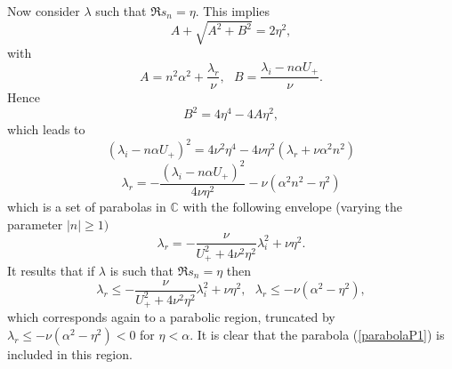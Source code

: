 \documentclass[11pt]{article}
\begin{document}
Now consider $\lambda $ such that $\Re s_{n}=\eta .$ This implies%
\begin{equation*}
A+\sqrt{A^{2}+B^{2}}=2\eta ^{2},
\end{equation*}%
with%
\begin{equation*}
A=n^{2}\alpha ^{2}+\frac{\lambda _{r}}{\nu },\text{ }B=\frac{\lambda
_{i}-n\alpha U_+ }{\nu }.
\end{equation*}%
Hence%
\begin{equation*}
B^{2}=4\eta ^{4}-4A\eta ^{2},
\end{equation*}%
which leads to%
\begin{equation*}
(\lambda _{i}-n\alpha U_+ )^{2}=4\nu ^{2}\eta ^{4}-4\nu \eta ^{2}(\lambda _{r}+\nu
\alpha ^{2}n^{2})
\end{equation*}%
\begin{equation*}
\lambda _{r}=-\frac{(\lambda _{i}-n\alpha U_+ )^{2}}{4\nu \eta ^{2}}-\nu (\alpha
^{2}n^{2}-\eta ^{2})
\end{equation*}%
which is a set of parabolas in $\mathbb{C} $ with the following envelope
(varying the parameter $|n|\geq 1)$%
\begin{equation*}
\lambda _{r}=-\frac{\nu }{U_+^{2}+4\nu ^{2}\eta ^{2}}%
\lambda _{i}^{2}+\nu \eta ^{2}.
\end{equation*}%
It results that if $\lambda $ is such that $\Re s_{n}=\eta $ then 
\begin{equation}
\lambda _{r}\leq -\frac{\nu }{U_+^{2}+4\nu ^{2}
\eta ^{2}}\lambda _{i}^{2}+\nu \eta ^{2},\text{ }\lambda _{r}\leq -\nu (\alpha
^{2}-\eta ^{2}),  \label{parabolaP2}
\end{equation}%
which corresponds again to a parabolic region, truncated by $\lambda
_{r}\leq -\nu (\alpha ^{2}-\eta ^{2})<0$ for $\eta <\alpha .$ It is clear that the
parabola (\ref{parabolaP1}) is included in this region.
\end{document}
